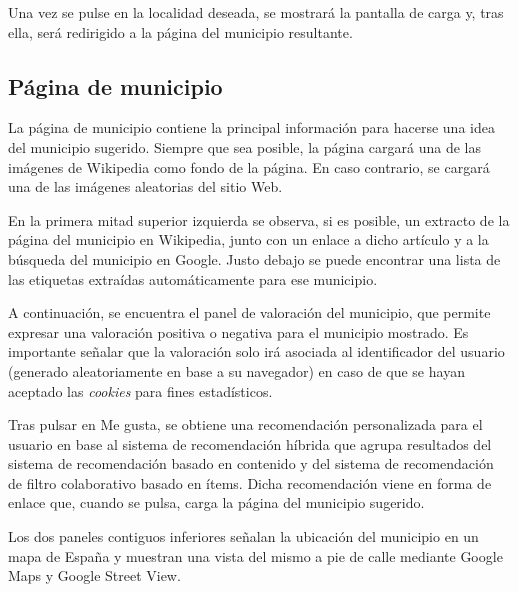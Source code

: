 Una vez se pulse en la localidad deseada, se mostrará la pantalla de carga y, tras ella, será redirigido a la página del municipio resultante.


\subsection{Página de municipio}

La página de municipio contiene la principal información para hacerse una idea del municipio sugerido. Siempre que sea posible, la página cargará una de las imágenes de Wikipedia como fondo de la página. En caso contrario, se cargará una de las imágenes aleatorias del sitio Web.


En la primera mitad superior izquierda se observa, si es posible, un extracto de la página del municipio en Wikipedia, junto con un enlace a dicho artículo y a la búsqueda del municipio en Google. Justo debajo se puede encontrar una lista de las etiquetas extraídas automáticamente para ese municipio.

A continuación, se encuentra el panel de valoración del municipio, que permite expresar una valoración positiva o negativa para el municipio mostrado. Es importante señalar que la valoración solo irá asociada al identificador del usuario (generado aleatoriamente en base a su navegador) en caso de que se hayan aceptado las \textit{cookies} para fines estadísticos.

Tras pulsar en \guillemotleft Me gusta\guillemotright, se obtiene una recomendación personalizada para el usuario en base al sistema de recomendación híbrida que agrupa resultados del sistema de recomendación basado en contenido y del sistema de recomendación de filtro colaborativo basado en ítems. Dicha recomendación viene en forma de enlace que, cuando se pulsa, carga la página del municipio sugerido.


Los dos paneles contiguos inferiores señalan la ubicación del municipio en un mapa de España y muestran una vista del mismo a pie de calle mediante Google Maps y Google Street View.


